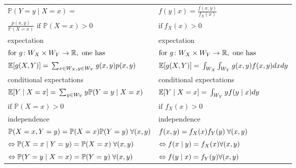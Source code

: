 {\begin{tabularx}{\linewidth}{X|X}
        $\mathbb{P}(Y=y\mid X=x)=$                                                        & $f(y\mid x)=\frac{f(x,y)}{f_X(x)}$                                       \\
        $\frac{p(x,y)}{\mathbb{P}(X=x)}\text{ if }\mathbb{P}(X=x)>0$                      & $\mathrm{if~}f_X(x)>0$                                                   \\
        \midrule
        expectation                                                                       & expectation                                                              \\
        $\text{for }g\colon W_X\times W_Y\to\mathbb{R},\newline \text{ one has}$          & $\text{for }g\colon W_X\times W_Y\to\mathbb{R},\newline \text{ one has}$ \\
        $\mathbb{E}[g(X,Y)]=\newline\sum_{x\in W_X,y\in W_Y}g(x,y)p(x,y)$                 & $\mathbb{E}[g(X,Y)]=\newline\int_{W_X}\int_{W_Y}g(x,y)f(x,y)dxdy$        \\
        \midrule
        conditional expectations                                                          & conditional expectations                                                 \\
        $\mathbb{E}[Y\mid X=x]=\newline \sum_{y\in W_Y}y\mathbb{P}(Y=y\mid X=x)$          & $\mathbb{E}[Y\mid X=x]=\newline \int_{W_Y}yf(y\mid x)dy$                 \\
        $\text{if }\mathbb{P}(X=x)>0$                                                     & $\text{if }f_X(x)>0$                                                     \\
        \midrule
        independence                                                                      & independence                                                             \\
        $\mathbb{P}(X=x,Y=y)=\newline \mathbb{P}(X=x)\mathbb{P}(Y=y)\; \forall(x,y)$      & $f(x,y)=\newline f_X(x)f_Y(y)\; \forall(x,y)$                            \\
        $\Leftrightarrow\mathbb{P}(X=x\mid Y=y)=\newline \mathbb{P}(X=x)\; \forall(x,y)$  & $\Leftrightarrow f(x\mid y) =f_X(x)\newline\forall(x,y)$                 \\
        $\Leftrightarrow\mathbb{P}(Y=y\mid X=x)=\newline \mathbb{P}(Y=y)\; \forall(x,y) $ & $\Leftrightarrow f(y\mid x) =f_Y(y)\newline\forall(x,y)$                 \\
    \end{tabularx}
} %

\renewcommand{\arraystretch}{1}
\setlength\tabcolsep{6pt} %